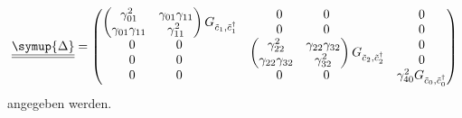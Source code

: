 \[
    \def\spacednull{\rlap{0}\phantom{\gamma_{01}^2\gamma_{11}}}
    \def\nullblock{\begin{matrix}\spacednull&\spacednull\\\spacednull&\spacednull\end{matrix}}
    \def\nullrow{\begin{matrix}\spacednull&\spacednull\end{matrix}}
% 
% 
     \underline{\underline{\symup{\Delta}}} = 
\begin{pmatrix}
    \begin{pmatrix}
        \gamma_{01}^2           & \gamma_{01}\gamma_{11}                \\
        \gamma_{01}\gamma_{11}  & \gamma_{11}^2                         \\
    \end{pmatrix} G_{\tilde{c}_1, \tilde{c}^\dagger_1}   &   \nullblock  &   \begin{matrix}0\\0\end{matrix}            \\
    \nullblock      & \begin{pmatrix}
                        \gamma_{22}^2           & \gamma_{22}\gamma_{32}\\
                        \gamma_{22}\gamma_{32}  & \gamma_{32}^2         \\
                      \end{pmatrix} G_{\tilde{c}_2, \tilde{c}^\dagger_2}  &   \begin{matrix}0\\0\end{matrix}          \\
    \nullrow      &   \nullrow  &   \gamma_{40}^2           G_{\tilde{c}_0, \tilde{c}^\dagger_0}       \\
\end{pmatrix}
\]
angegeben werden.
